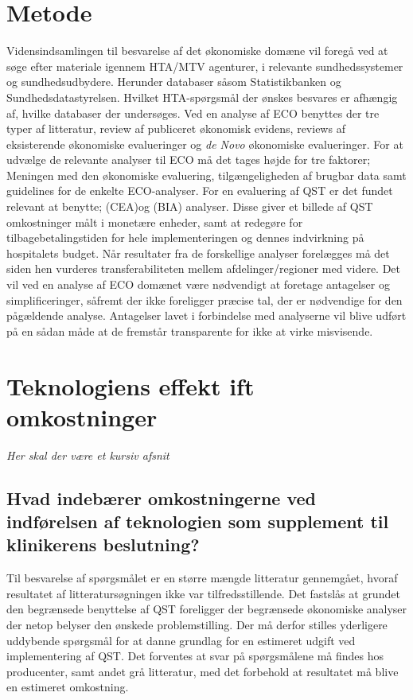 \section{Metode}
Vidensindsamlingen til besvarelse af det økonomiske domæne vil foregå ved at søge efter materiale igennem HTA/MTV agenturer, i relevante sundhedssystemer og sundhedsudbydere. Herunder databaser såsom Statistikbanken og Sundhedsdatastyrelsen. Hvilket HTA-spørgsmål der ønskes besvares er afhængig af, hvilke databaser der undersøges. Ved en analyse af ECO benyttes der tre typer af litteratur, review af publiceret økonomisk evidens, reviews af eksisterende økonomiske evalueringer og \textit{de Novo} økonomiske evalueringer. For at udvælge de relevante analyser til ECO må det tages højde for tre faktorer; Meningen med den økonomiske evaluering, tilgængeligheden af brugbar data samt guidelines for de enkelte ECO-analyser. For en evaluering af QST er det fundet relevant at benytte; (CEA)og (BIA) analyser. Disse giver et billede af QST omkostninger målt i monetære enheder, samt at redegøre for tilbagebetalingstiden for hele implementeringen og dennes indvirkning på hospitalets budget. Når resultater fra de forskellige analyser forelægges må det siden hen vurderes transferabiliteten mellem afdelinger/regioner med videre. Det vil ved en analyse af ECO domænet være nødvendigt at foretage antagelser og simplificeringer, såfremt der ikke foreligger præcise tal, der er nødvendige for den pågældende analyse. Antagelser lavet i forbindelse med analyserne vil blive udført på en sådan måde at de fremstår transparente for ikke at virke misvisende. 

\section{Teknologiens effekt ift omkostninger}

\textit{Her skal der være et kursiv afsnit}

\subsection*{Hvad indebærer omkostningerne ved indførelsen af teknologien som supplement til klinikerens beslutning?}

Til besvarelse af spørgsmålet er en større mængde litteratur gennemgået, hvoraf resultatet af litteratursøgningen ikke var tilfredsstillende. Det fastslås at grundet den begrænsede benyttelse af QST foreligger der begrænsede økonomiske analyser der netop belyser den ønskede problemstilling. Der må derfor stilles yderligere uddybende spørgsmål for at danne grundlag for en estimeret udgift ved implementering af QST. Det forventes at svar på spørgsmålene må findes hos producenter, samt andet grå litteratur, med det forbehold at resultatet må blive en estimeret omkostning. 

